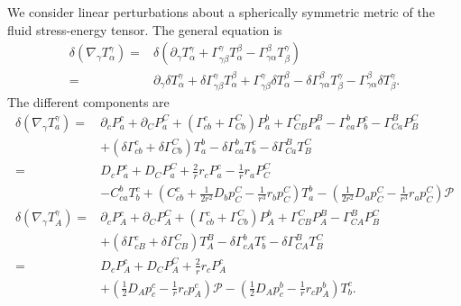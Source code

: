 \documentclass[12pt]{report}
\begin{document}
We consider linear perturbations about a spherically symmetric metric
of the fluid stress-energy tensor.
The general equation is
\begin{align}
    \delta \left(\nabla_{\gamma}T^{\gamma}_{\alpha}\right)
    =&
    \delta \left(
        \partial_{\gamma}T^{\gamma}_{\alpha}
        +
        \Gamma^{\gamma}_{\gamma\beta}T^{\beta}_{\alpha}
        -
        \Gamma^{\beta}_{\gamma\alpha}T^{\gamma}_{\beta}
    \right)
    \nonumber\\
    =&
    \partial_{\gamma}\delta T^{\gamma}_{\alpha}
    +
    \delta \Gamma^{\gamma}_{\gamma\beta}T^{\beta}_{\alpha}
    +
    \Gamma^{\gamma}_{\gamma\beta}\delta T^{\beta}_{\alpha}
    -
    \delta \Gamma^{\beta}_{\gamma\alpha}T^{\gamma}_{\beta}
    -
    \Gamma^{\beta}_{\gamma\alpha}\delta T^{\gamma}_{\beta}
    .
\end{align}
The different components are
\begin{subequations}
\begin{align}
    \label{eq:linear_pert_se_eom_a_comp}
    \delta\left(\nabla_{\gamma}T^{\gamma}_{a}\right)
    =&
    \partial_{c}P^{c}_{a}
    +
    \partial_{C}P^{C}_{a}
    +
    \left(
        \Gamma^{c}_{cb}
        +
        \Gamma^{C}_{Cb}
    \right)
    P^{b}_{a}
    +
    \Gamma^{C}_{CB}P^{B}_{a}
    -
    \Gamma^b_{ca}P^c_b
    -
    \Gamma^B_{Ca}P^C_B
    \nonumber\\
    &
    +
    \left(
        \delta\Gamma^c_{cb}
        +
        \delta\Gamma^C_{Cb}
    \right)
    T^b_a
    -
    \delta\Gamma^b_{ca}T^c_b
    -
    \delta\Gamma^B_{Ca}T^C_B
    \nonumber\\
    =&
    D_cP^{c}_{a}
    +
    D_CP^{C}_{a}
    +
    \frac{2}{r}r_cP^{c}_{a}
    -
    \frac{1}{r}r_aP^C_C
    \nonumber\\
    &
    -
    C^b_{ca}T^c_b
    +
    \left(
        C^c_{cb}
        +
        \frac{1}{2r^2}D_bp^C_C
        -
        \frac{1}{r^3}r_bp^C_C
    \right)
    T^b_a
    -
    \left(
        \frac{1}{2r^2}D_ap^C_C
        -
        \frac{1}{r^3}r_ap^C_C
    \right)
    \mathcal{P}
    \\
    \label{eq:linear_pert_se_eom_A_comp}
    \delta\left(\nabla_{\gamma}T^{\gamma}_{A}\right)
    =&
    \partial_cP^{c}_{A}
    +
    \partial_CP^{C}_{A}
    +
    \left(
        \Gamma^{c}_{cb}
        +
        \Gamma^C_{Cb}
    \right)
    P^{b}_{A}
    +
    \Gamma^{C}_{CB}P^{B}_{A}
    -
    \Gamma^B_{CA}P^C_B
    \nonumber\\
    &
    +
    \left(  
        \delta\Gamma^c_{cB}
        +
        \delta\Gamma^C_{CB}
    \right)
    T^B_A
    -
    \delta\Gamma^b_{cA}T^c_b
    -
    \delta\Gamma^B_{CA}T^C_B
    \nonumber\\
    =&
    D_cP^{c}_{A}
    +
    D_CP^{C}_{A}
    +
    \frac{2}{r}r_cP^{c}_{A}
    \nonumber\\
    &
    +
    \left(
        \frac{1}{2}D_Ap^c_c
        -
        \frac{1}{r}r_cp^c_A
    \right)
    \mathcal{P}
    -
    \left(
        \frac{1}{2}
        D_Ap^b_c
        -
        \frac{1}{r}r_cp^b_A
    \right)
    T^c_b
    .
\end{align}
\end{subequations}
\end{document}
